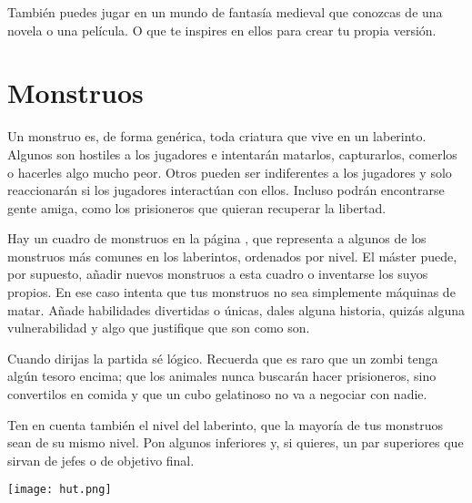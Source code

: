 \begin{multicols}{2}
También puedes jugar en un mundo de fantasía medieval que conozcas de una novela
o una película. O que te inspires en ellos para crear tu propia versión.

\section{Monstruos}

Un monstruo es, de forma genérica, toda criatura que vive en un laberinto. Algunos
son hostiles a los jugadores e intentarán matarlos, capturarlos, comerlos o hacerles
algo mucho peor. Otros pueden ser indiferentes a los jugadores y solo reaccionarán
si los jugadores interactúan con ellos. Incluso podrán encontrarse gente amiga, como
los prisioneros que quieran recuperar la libertad.

Hay un cuadro de monstruos en la página \pageref{c:monstruos}, que representa a
algunos de los monstruos más comunes en los laberintos, ordenados por nivel. El
máster puede, por supuesto, añadir nuevos monstruos a esta cuadro o inventarse los
suyos propios. En ese caso intenta que tus monstruos no sea simplemente máquinas
de matar. Añade habilidades divertidas o únicas, dales alguna historia, quizás
alguna vulnerabilidad y algo que justifique que son como son.

Cuando dirijas la partida sé lógico. Recuerda que es raro que un zombi tenga algún
tesoro encima; que los animales nunca buscarán hacer prisioneros, sino convertilos
en comida y que un cubo gelatinoso no va a negociar con nadie.

Ten en cuenta también el nivel del laberinto, que la mayoría de tus monstruos sean
de su mismo nivel. Pon algunos inferiores y, si quieres, un par superiores que sirvan
de jefes o de objetivo final.

\texttt{[image: hut.png]}


\end{multicols}
